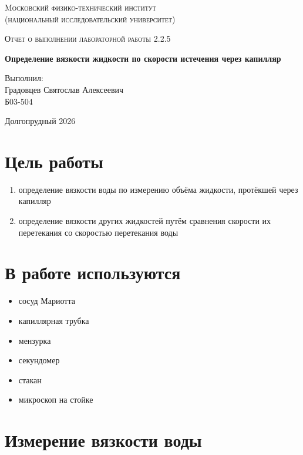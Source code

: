 \documentclass[a4paper]{article}
\begin{document}
\begin{titlepage}
	\centering
	{\scshape\Large Mосковский физико-технический институт \\ (национальный исследовательский университет) \par}
	\vspace{6cm}
	{\scshape\Large Отчет о выполнении лабораторной работы 2.2.5 \par}
	\vspace{1cm}
	{\huge\bfseries Определение вязкости жидкости по скорости истечения через капилляр \par}
	\vspace{4cm}
	\vfill
	\begin{flushright}
		{\large Выполнил: \\ Градовцев Святослав Алексеевич \\ Б03-504 \par}
	\end{flushright}
	\vfill
	{\large \centering Долгопрудный 2026 \par}
\end{titlepage}

\section{Цель работы}
\begin{enumerate}
    \item определение вязкости воды по измерению объёма жидкости, протёкшей через капилляр
    \item определение вязкости других жидкостей путём сравнения скорости их перетекания со скоростью перетекания воды
\end{enumerate}

\section{В работе используются}
\begin{itemize}
    \item сосуд Мариотта
    \item капиллярная трубка
    \item мензурка
    \item секундомер
    \item стакан
    \item микроскоп на стойке
\end{itemize}

\section{Измерение вязкости воды}
\end{document}
